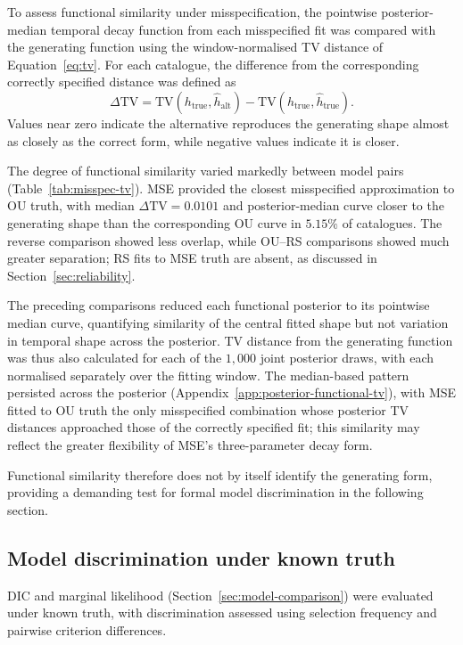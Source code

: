 \documentclass{statsmsc}
\begin{document}
To assess functional similarity under misspecification, the pointwise posterior-median temporal decay function from each misspecified fit was compared with the generating function using the window-normalised TV distance of Equation~\eqref{eq:tv}. For each catalogue, the difference from the corresponding correctly specified distance was defined as
\begin{equation*}
\Delta\mathrm{TV} = \mathrm{TV}(h_{\mathrm{true}}, \hat{h}_{\mathrm{alt}}) - \mathrm{TV}(h_{\mathrm{true}}, \hat{h}_{\mathrm{true}}).
\end{equation*} 
Values near zero indicate the alternative reproduces the generating shape almost as closely as the correct form, while negative values indicate it is closer. 

The degree of functional similarity varied markedly between model pairs (Table~\ref{tab:misspec-tv}). MSE provided the closest misspecified approximation to OU truth, with median $\Delta \mathrm{TV}=0.0101$ and posterior-median curve closer to the generating shape than the corresponding OU curve in $5.15\%$ of catalogues. The reverse comparison showed less overlap, while OU--RS comparisons showed much greater separation; RS fits to MSE truth are absent, as discussed in Section~\ref{sec:reliability}. 

The preceding comparisons reduced each functional posterior to its pointwise median curve, quantifying similarity of the central fitted shape but not variation in temporal shape across the posterior. TV distance from the generating function was thus also calculated for each of the $1{,}000$ joint posterior draws, with each normalised separately over the fitting window. The median-based pattern persisted across the posterior (Appendix~\ref{app:posterior-functional-tv}), with MSE fitted to OU truth the only misspecified combination whose posterior TV distances approached those of the correctly specified fit; this similarity may reflect the greater flexibility of MSE's three-parameter decay form. 

Functional similarity therefore does not by itself identify the generating form, providing a demanding test for formal model discrimination in the following section.

\subsection{Model discrimination under known truth} \label{sec:synth-performance}
DIC and marginal likelihood (Section~\ref{sec:model-comparison}) were evaluated under known truth, with discrimination assessed using selection frequency and pairwise criterion differences.
\end{document}
